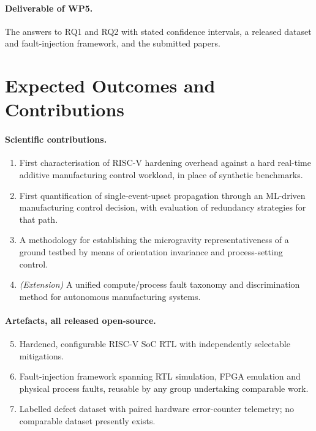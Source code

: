 \documentclass[11pt,a4paper]{article}
\begin{document}
\paragraph{Deliverable of WP5.}
The answers to RQ1 and RQ2 with stated confidence intervals, a released dataset
and fault-injection framework, and the submitted papers.

\section{Expected Outcomes and Contributions}

\paragraph{Scientific contributions.}
\begin{enumerate}[leftmargin=*]
  \item First characterisation of RISC-V hardening overhead against a hard
        real-time additive manufacturing control workload, in place of synthetic
        benchmarks.
  \item First quantification of single-event-upset propagation through an
        ML-driven manufacturing control decision, with evaluation of redundancy
        strategies for that path.
  \item A methodology for establishing the microgravity representativeness of a
        ground testbed by means of orientation invariance and process-setting
        control.
  \item \emph{(Extension)} A unified compute/process fault taxonomy and
        discrimination method for autonomous manufacturing systems.
\end{enumerate}

\paragraph{Artefacts, all released open-source.}
\begin{enumerate}[leftmargin=*]\setcounter{enumi}{4}
  \item Hardened, configurable RISC-V SoC RTL with independently selectable
        mitigations.
  \item Fault-injection framework spanning RTL simulation, FPGA emulation and
        physical process faults, reusable by any group undertaking comparable
        work.
  \item Labelled defect dataset with paired hardware error-counter telemetry; no
        comparable dataset presently exists.
\end{enumerate}
\end{document}
